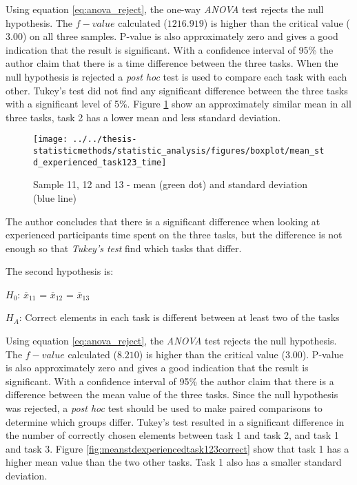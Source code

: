 Using equation \ref{eq:anova_reject}, the one-way \textit{ANOVA} test rejects the null hypothesis. The $f-value$ calculated ($1216.919$) is higher than the critical value ($3.00$) on all three samples. P-value is also approximately zero and gives a good indication that the result is significant. With a confidence interval of 95\% the author claim that there is a time difference between the three tasks. When the null hypothesis is rejected a \textit{post hoc} test is used to compare each task with each other. Tukey's test did not find any significant difference between the three tasks with a significant level of 5\%. Figure \ref{fig:meanstdexperiencedtask123time} show an approximately similar mean in all three tasks, task 2 has a lower mean and less standard deviation. 

\begin{figure}[H]
	\centering
	\texttt{[image: ../../thesis-statisticmethods/statistic\_analysis/figures/boxplot/mean\_std\_experienced\_task123\_time]}
	\caption{Sample 11, 12 and 13 - mean (green dot) and standard deviation (blue line)}
	\label{fig:meanstdexperiencedtask123time}
\end{figure}

The author concludes that there is a significant difference when looking at experienced participants time spent on the three tasks, but the difference is not enough so that \textit{Tukey's test} find which tasks that differ. \newline

The second hypothesis is:\\
\centerline{$H_{0}$: $\overline{x}_11$ = $\overline{x}_12$ = $\overline{x}_13$}
\centerline{$H_{A}$: Correct elements in each task is different between at least two of the tasks}

Using equation \ref{eq:anova_reject}, the \textit{ANOVA} test rejects the null hypothesis. The $f-value$ calculated ($8.210$) is higher than the critical value ($3.00$). P-value is also approximately zero and gives a good indication that the result is significant. With a confidence interval of 95\% the author claim that there is a difference between the mean value of the three tasks. Since the null hypothesis was rejected, a \textit{post hoc} test should be used to make paired comparisons to determine which groups differ. Tukey's test resulted in a significant difference in the number of correctly chosen elements between task 1 and task 2, and task 1 and task 3. Figure \ref{fig:meanstdexperiencedtask123correct} show that task 1 has a higher mean value than the two other tasks. Task 1 also has a smaller standard deviation. 

